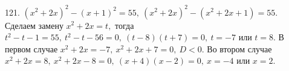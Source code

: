 121. $(x^2+2x)^2-(x+1)^2=55,\ (x^2+2x)^2-(x^2+2x+1)=55.$ Сделаем замену $x^2+2x=t,$ тогда $t^2-t-1=55,\ t^2-t-56=0,\ (t-8)(t+7)=0,\ t=-7$ или $t=8.$ В первом случае
$x^2+2x=-7,\ x^2+2x+7=0,\ D<0.$ Во втором случае $x^2+2x=8,\ x^2+2x-8=0,\ (x+4)(x-2)=0,\ x=-4$ или $x=2.$\\

